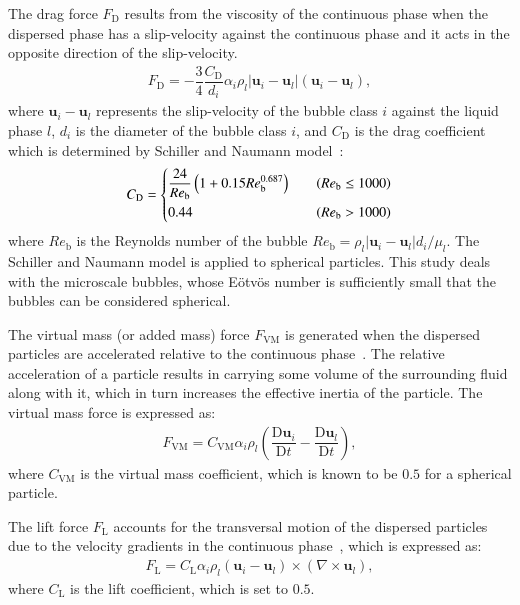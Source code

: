 \documentclass[3p, twocolumn, 10pt]{elsarticle}
\begin{document}
The drag force $F_{\mathrm{D}}$ results from the viscosity of the continuous phase when the dispersed phase has a slip-velocity against the continuous phase and it acts in the opposite direction of the slip-velocity.
\begin{align}
  F_{\mathrm{D}} = - \dfrac{3}{4}\dfrac{C_{\mathrm{D}}}{d_{i}}
  \alpha_{i}\rho_{l}
  \left|\bm{u}_{i} - \bm{u}_{l}\right|
  \left(\bm{u}_{i} - \bm{u}_{l}\right),
\end{align}
where $\bm{u}_{i} - \bm{u}_{l}$ represents the slip-velocity of the bubble class $i$ against the liquid phase $l$, $d_{i}$ is the diameter of the bubble class $i$, and $C_{\mathrm{D}}$ is the drag coefficient which is determined by Schiller and Naumann model~\cite{schillerDrag1933}:
\begin{align}
  C_{\mathrm{D}} =
  \begin{dcases}
  \dfrac{24}{Re_\mathrm{b}}\left(1+0.15Re_\mathrm{b}^{0.687}\right) & \quad \left(Re_\mathrm{b}\leq 1000\right)\\
  0.44                                        & \quad \left(Re_\mathrm{b}> 1000\right)\\
  \end{dcases}
\end{align}
where $Re_\mathrm{b}$ is the Reynolds number of the bubble $Re_\mathrm{b}=\rho_{l}\left|\bm{u}_{i}-\bm{u}_{l}\right|d_{i}/\mu_{l}$. 
The Schiller and Naumann model is applied to spherical particles.
This study deals with the microscale bubbles, whose Eötvös number is sufficiently small that the bubbles can be considered spherical.

The virtual mass (or added mass) force $F_{\mathrm{VM}}$ is generated when the dispersed particles are accelerated relative to the continuous phase~\cite{drewAnalysisVirtualMass1979}.
The relative acceleration of a particle results in carrying some volume of the surrounding fluid along with it, which in turn increases the effective inertia of the particle.
The virtual mass force is expressed as: 
\begin{align}
  F_{\mathrm{VM}} = C_{\mathrm{VM}}\alpha_{i}\rho_{l}
  \left(
  \dfrac{\mathrm{D}\bm{u}_{i}}{\mathrm{D}t}
  -
  \dfrac{\mathrm{D}\bm{u}_{l}}{\mathrm{D}t}
  \right),
\end{align}
where $C_{\mathrm{VM}}$ is the virtual mass coefficient, which is known to be $0.5$ for a spherical particle.

The lift force $F_{\mathrm{L}}$ accounts for the transversal motion of the dispersed particles due to the velocity gradients in the continuous phase~\cite{drewVirtualMassLift1987}, which is expressed as:
\begin{align}
  F_{\mathrm{L}} = C_{\mathrm{L}}\alpha_{i}\rho_{l}
  \left(\bm{u}_{i}-\bm{u}_{l}\right)
  \times
  \left(\nabla\times\bm{u}_{l}\right),
\end{align}
where $C_{\mathrm{L}}$ is the lift coefficient, which is set to $0.5$.
\end{document}
